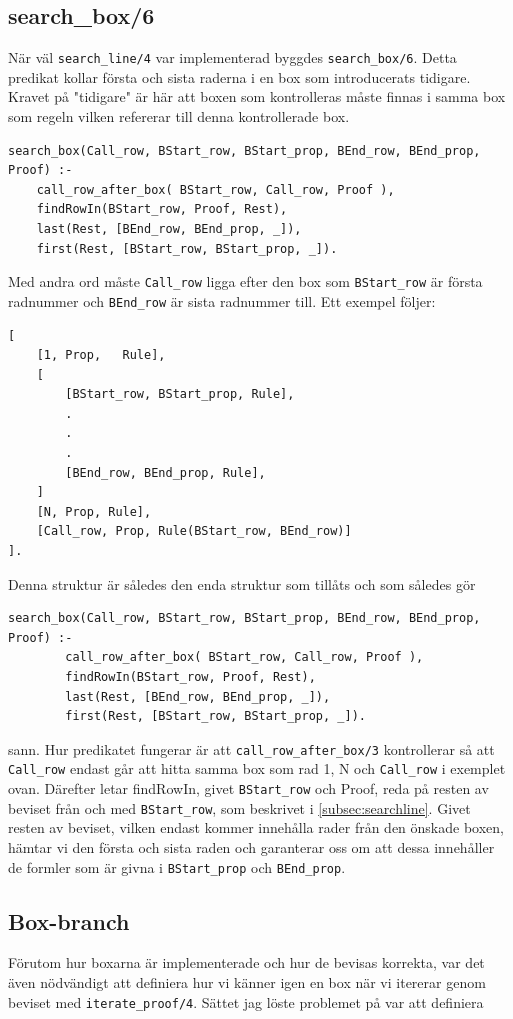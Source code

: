\documentclass[a4paper]{article}
\begin{document}
\subsection{search\_box/6}
När väl \texttt{search_line/4} var implementerad byggdes \texttt{search_box/6}. Detta predikat kollar första och sista raderna i en box som introducerats tidigare. Kravet på "tidigare" är här att boxen som kontrolleras måste finnas i samma box som regeln vilken refererar till denna kontrollerade box.
\begin{verbatim}
search_box(Call_row, BStart_row, BStart_prop, BEnd_row, BEnd_prop, Proof) :-
	call_row_after_box( BStart_row, Call_row, Proof ),
	findRowIn(BStart_row, Proof, Rest),
	last(Rest, [BEnd_row, BEnd_prop, _]),
	first(Rest, [BStart_row, BStart_prop, _]).
\end{verbatim}
Med andra ord måste \texttt{Call_row} ligga efter den box som \texttt{BStart_row} är första radnummer och \texttt{BEnd_row} är sista radnummer till. Ett exempel följer:
\begin{verbatim}
[
	[1, Prop,	Rule],
	[
		[BStart_row, BStart_prop, Rule],
		.
		.
		.
		[BEnd_row, BEnd_prop, Rule],
	]
	[N, Prop, Rule],
	[Call_row, Prop, Rule(BStart_row, BEnd_row)]
].
\end{verbatim}
Denna struktur är således den enda struktur som tillåts och som således gör 
\begin{verbatim}
search_box(Call_row, BStart_row, BStart_prop, BEnd_row, BEnd_prop, Proof) :-
        call_row_after_box( BStart_row, Call_row, Proof ),
        findRowIn(BStart_row, Proof, Rest),
        last(Rest, [BEnd_row, BEnd_prop, _]),
        first(Rest, [BStart_row, BStart_prop, _]).
\end{verbatim}
sann. Hur predikatet fungerar är att \texttt{call_row_after_box/3} kontrollerar så att \texttt{Call_row} endast går att hitta samma box som rad 1, N och \texttt{Call_row} i exemplet ovan. Därefter letar findRowIn, givet \texttt{BStart_row} och Proof, reda på resten av beviset från och med \texttt{BStart_row}, som beskrivet i \ref{subsec:searchline}. Givet resten av beviset, vilken endast kommer innehålla rader från den önskade boxen, hämtar vi den första och sista raden och garanterar oss om att dessa innehåller de formler som är givna i \texttt{BStart_prop} och \texttt{BEnd_prop}.

\subsection{Box-branch}
Förutom hur boxarna är implementerade och hur de bevisas korrekta, var det även nödvändigt att definiera hur vi känner igen en box när vi itererar genom beviset med \texttt{iterate_proof/4}. Sättet jag löste problemet på var att definiera
\end{document}
